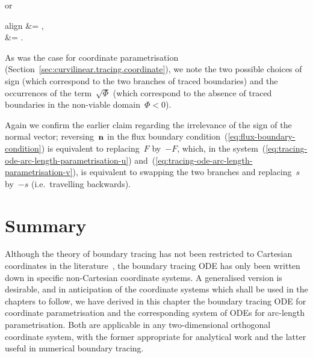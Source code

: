 or
\begin{important}{align}
   &= ,
    \label{eq:tracing-ode-arc-length-parametrisation-u} \\[\tallspace]
   &= .
    \label{eq:tracing-ode-arc-length-parametrisation-v}
\end{important}
As was the case for coordinate parametrisation
(Section~\ref{sec:curvilinear.tracing.coordinate}),
we note the two possible choices of sign
(which correspond to the two branches of traced boundaries)
and the occurrences of the term~$\sqrt{\Phi}$
(which correspond to the absence of traced boundaries
in the non-viable domain~$\Phi < 0$).

Again we confirm the earlier claim
regarding the irrelevance of the sign of the normal vector;
reversing~$\mathop{}\!\boldsymbol{\mathbf{n}}$
in the flux boundary condition~(\ref{eq:flux-boundary-condition})
is equivalent to replacing~$F$ by~$-F$,
which, in the system~(\ref{eq:tracing-ode-arc-length-parametrisation-u})
and~(\ref{eq:tracing-ode-arc-length-parametrisation-v}),
is equivalent to swapping the two branches
and replacing~$s$ by~$-s$ (i.e.~travelling backwards).

\section{Summary}
\label{sec:curvilinear.summary}

Although the theory of boundary tracing
has not been restricted to Cartesian coordinates in the literature~\cite{
  anderson-2002-thesis-boundary-tracing-pdes,
  anderson-2007-boundary-tracing-i-theory,
  anderson-2007-boundary-tracing-ii-applications
},
the boundary tracing ODE has only been written down
in specific non-Cartesian coordinate systems.
A generalised version is desirable,
and in anticipation of the coordinate systems
which shall be used in the chapters to follow,
we have derived in this chapter
the boundary tracing ODE for coordinate parametrisation
and the corresponding system of ODEs for arc-length parametrisation.
Both are applicable in any two-dimensional orthogonal coordinate system,
with the former appropriate for analytical work
and the latter useful in numerical boundary tracing.

